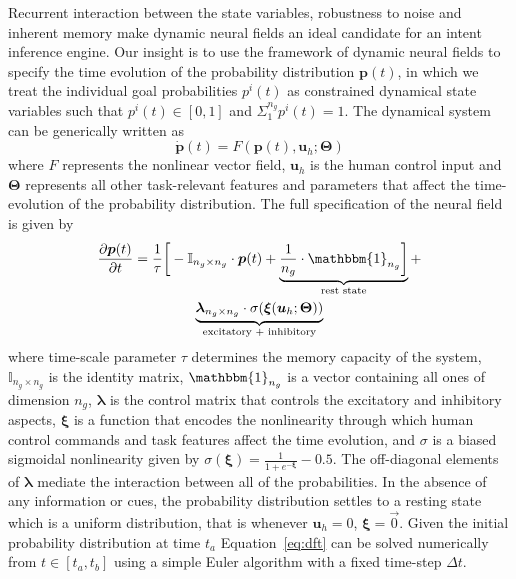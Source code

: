 \documentclass[natbib, twocolumn]{svjour3}          %
\begin{document}
Recurrent interaction between the state variables, 
robustness to noise and inherent memory make dynamic neural fields an ideal candidate for an intent inference engine. Our insight is to use the framework of dynamic neural fields to specify the time evolution of the probability distribution $\boldsymbol{p}(t)$, in which we treat the individual goal probabilities $p^i(t)$ as constrained dynamical state variables such that $p^i(t) \in [0, 1]$ and $\Sigma_{1}^{n_g}p^{i}(t) = 1$. The dynamical system can be generically written as 
\begin{equation*}
\dot{\boldsymbol{p}}(t) = F(\boldsymbol{p}(t), \boldsymbol{u}_h ; \boldsymbol{\Theta})
\end{equation*}
where $F$ represents the nonlinear vector field, $\boldsymbol{u}_h$ is the human control input and $\boldsymbol{\Theta}$ represents all other task-relevant features and parameters that affect the time-evolution of the probability distribution. 
The full specification of the neural field is given by
\begin{multline}\label{eq:dft}
\frac{\partial \boldsymbol{p}(t)}{\partial t} = \frac{1}{\tau}\bigg[-\mathbb{I}_{n_g\times n_g}\cdot\boldsymbol{p}(t) + \underbrace{\frac{1}{n_g}\cdot\mathbbm{1}_{n_g}\bigg]}_{\text{rest state}} + \\ \underbrace{\boldsymbol{\lambda}_{n_g\times n_g}\cdot\sigma(\boldsymbol{\xi}(\boldsymbol{u}_h;\boldsymbol{\Theta}))}_{\text{excitatory + inhibitory}}
\end{multline}
where time-scale parameter $\tau$ determines the memory capacity of the system, $\mathbb{I}_{n_g\times n_g}$ is the identity matrix, $\mathbbm{1}_{n_g}$ is a vector containing all ones of dimension $n_g$, $\boldsymbol{\lambda}$ is the control matrix that controls the excitatory and inhibitory aspects, $\boldsymbol{\xi}$ is a function that encodes the nonlinearity through which human control commands and task features affect the time evolution, and $\sigma$ is a biased sigmoidal nonlinearity given by $\sigma(\boldsymbol{\xi}) = \frac{1}{1 + e^{-\boldsymbol{\xi}}} - 0.5$.
The off-diagonal elements of $\boldsymbol{\lambda}$ mediate the interaction between all of the probabilities. In the absence of any information or cues, the probability distribution settles to a resting state which is a uniform distribution, that is whenever $\boldsymbol{u}_h = 0$, $\boldsymbol{\xi} = \vec{0}$. Given the initial probability distribution at time $t_a$ Equation~\ref{eq:dft} can be solved numerically from $t \in [t_a, t_b]$ using a simple Euler algorithm with a fixed time-step $\Delta t$.
\end{document}
